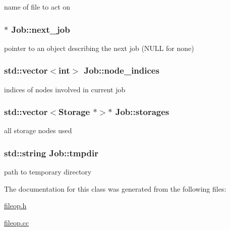 name of file to act on 

\hypertarget{classJob_a89cbef000d5b92aa67bac749ffb5b212}{
\subsubsection[{next\-\_\-job}]{$\ast$ {\bf \-Job\-::next\-\_\-job}}}\label{classJob_a89cbef000d5b92aa67bac749ffb5b212}


pointer to an object describing the next job (\-N\-U\-L\-L for none) 

\hypertarget{classJob_ae18030f6a246c7fcb12e2048ae367ae5}{
\subsubsection[{node\-\_\-indices}]{\setlength{\rightskip}{0pt plus 5cm}std\-::vector$<$int$>$ {\bf \-Job\-::node\-\_\-indices}}}\label{classJob_ae18030f6a246c7fcb12e2048ae367ae5}


indices of nodes involved in current job 

\hypertarget{classJob_ad53e461116a332c139528df7899f0a9e}{
\subsubsection[{storages}]{\setlength{\rightskip}{0pt plus 5cm}std\-::vector$<${\bf \-Storage} $\ast$$>$$\ast$ {\bf \-Job\-::storages}}}\label{classJob_ad53e461116a332c139528df7899f0a9e}


all storage nodes used 

\hypertarget{classJob_a1222a22533b8e17d4e75e2f9b5cecaab}{
\subsubsection[{tmpdir}]{\setlength{\rightskip}{0pt plus 5cm}std\-::string {\bf \-Job\-::tmpdir}}}\label{classJob_a1222a22533b8e17d4e75e2f9b5cecaab}


path to temporary directory 



\-The documentation for this class was generated from the following files\-:\begin{DoxyCompactItemize}
\item 
\hyperlink{fileop_8h}{fileop.\-h}\item 
\hyperlink{fileop_8cc}{fileop.\-cc}\end{DoxyCompactItemize}
